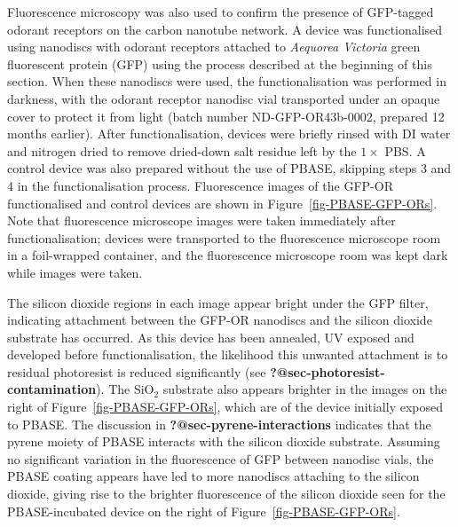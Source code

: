 \documentclass[
  a4paper,
]{scrbook}
\begin{document}
Fluorescence microscopy was also used to confirm the presence of
GFP-tagged odorant receptors on the carbon nanotube network. A device
was functionalised using nanodiscs with odorant receptors attached to
\emph{Aequorea Victoria} green fluorescent protein (GFP) using the
process described at the beginning of this section. When these nanodiscs
were used, the functionalisation was performed in darkness, with the
odorant receptor nanodisc vial transported under an opaque cover to
protect it from light (batch number ND-GFP-OR43b-0002, prepared 12
months earlier). After functionalisation, devices were briefly rinsed
with DI water and nitrogen dried to remove dried-down salt residue left
by the \(1 \times\) PBS. A control device was also prepared without the
use of PBASE, skipping steps 3 and 4 in the functionalisation process.
Fluorescence images of the GFP-OR functionalised and control devices are
shown in Figure~\ref{fig-PBASE-GFP-ORs}. Note that fluorescence
microscope images were taken immediately after functionalisation;
devices were transported to the fluorescence microscope room in a
foil-wrapped container, and the fluorescence microscope room was kept
dark while images were taken.

The silicon dioxide regions in each image appear bright under the GFP
filter, indicating attachment between the GFP-OR nanodiscs and the
silicon dioxide substrate has occurred. As this device has been
annealed, UV exposed and developed before functionalisation, the
likelihood this unwanted attachment is to residual photoresist is
reduced significantly (see \textbf{?@sec-photoresist-contamination}).
The SiO\(_2\) substrate also appears brighter in the images on the right
of Figure~\ref{fig-PBASE-GFP-ORs}, which are of the device initially
exposed to PBASE. The discussion in \textbf{?@sec-pyrene-interactions}
indicates that the pyrene moiety of PBASE interacts with the silicon
dioxide substrate. Assuming no significant variation in the fluorescence
of GFP between nanodisc vials, the PBASE coating appears have led to
more nanodiscs attaching to the silicon dioxide, giving rise to the
brighter fluorescence of the silicon dioxide seen for the
PBASE-incubated device on the right of Figure~\ref{fig-PBASE-GFP-ORs}.
\end{document}
